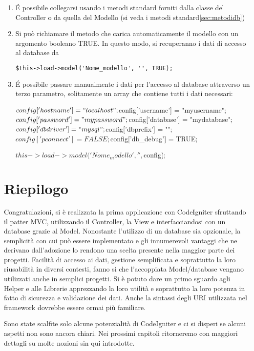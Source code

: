 \begin{enumerate}
\item \'E possibile collegarsi usando i metodi standard forniti dalla classe del Controller o da quella del Modello (si veda i metodi standard\vref{sec:metodidb})
\item Si può richiamare il metodo che carica automaticamente il modello con un argomento booleano TRUE. In questo modo, si recuperanno i dati di accesso al database da 

\verb|$this->load->model('Nome_modello', '', TRUE);|

\item \'E possibile passare manualmente i dati per l'accesso al database attraverso un terzo parametro, solitamente un array che contiene tutti i dati necessari:

\begin{code}
$config['hostname'] = "localhost";
$config['username'] = "myusername";
$config['password'] = "mypassword";
$config['database'] = "mydatabase";
$config['dbdriver'] = "mysql";
$config['dbprefix'] = "";
$config['pconnect'] = FALSE;
$config['db_debug'] = TRUE;

$this->load->model('Nome_modello', '', $config);
\end{code}
\end{enumerate}

\section{Riepilogo}
Congratulazioni, si è realizzata la prima applicazione con CodeIgniter sfruttando il patter \ac{MVC}, utilizzando il Controller, la View e interfacciandosi con un database grazie al Model. Nonostante l'utilizzo di un database sia opzionale, la semplicità con cui può essere implementato e gli innumerevoli vantaggi che ne derivano dall'adozione lo rendono una scelta presente nella maggior parte dei progetti. Facilità di accesso ai dati, gestione semplificata e soprattutto la loro riusabilità in diversi contesti, fanno sì che l'accoppiata Model/database vengano utilizzati anche in semplici progetti. Si è potuto dare un primo sguardo agli Helper e alle Librerie apprezzando la loro utilità e soprattutto la loro potenza in fatto di sicurezza e validazione dei dati. Anche la sintassi degli \ac{URI} utilizzata nel framework dovrebbe essere ormai più familiare.

Sono state scalfite solo alcune potenzialità di CodeIgniter e ci si disperi se alcuni aspetti non sono ancora chiari. Nei prossimi capitoli ritorneremo con maggiori dettagli su molte nozioni sin qui introdotte.